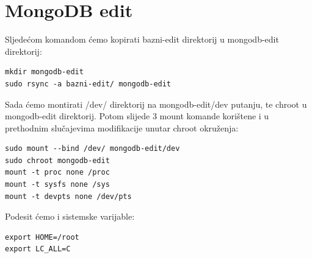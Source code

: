 \documentclass[12pt,vi]{mitthesis}
\begin{document}
\section*{MongoDB edit}

\indent
Sljedećom komandom ćemo kopirati bazni-edit direktorij u mongodb-edit direktorij:
\begin{lstlisting}[style=BashInputStyle]
mkdir mongodb-edit
sudo rsync -a bazni-edit/ mongodb-edit
\end{lstlisting}

Sada ćemo montirati /dev/ direktorij na mongodb-edit/dev putanju, te chroot u mongodb-edit direktorij. Potom slijede 3 mount komande korištene i u prethodnim slučajevima modifikacije unutar chroot okruženja:
\begin{lstlisting}[style=BashInputStyle]
sudo mount --bind /dev/ mongodb-edit/dev
sudo chroot mongodb-edit
mount -t proc none /proc
mount -t sysfs none /sys
mount -t devpts none /dev/pts
\end{lstlisting}

Podesit ćemo i sistemske varijable:
\begin{lstlisting}[style=BashInputStyle]
export HOME=/root
export LC_ALL=C
\end{lstlisting}
\end{document}
